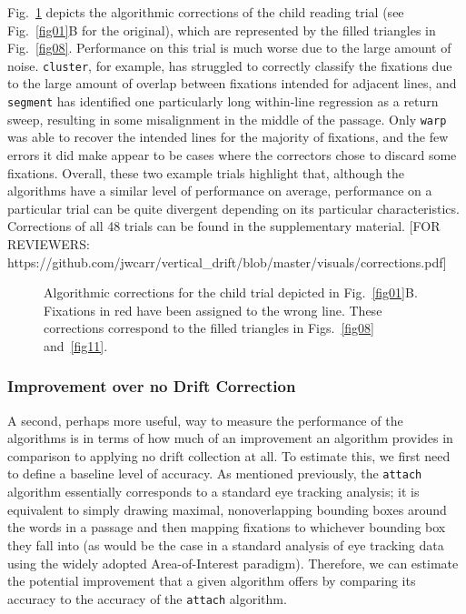 \documentclass[doc,biblatex]{apa7}
\begin{document}
Fig.~\ref{fig10} depicts the algorithmic corrections of the child reading trial (see Fig.~\ref{fig01}B for the original), which are represented by the filled triangles in Fig.~\ref{fig08}. Performance on this trial is much worse due to the large amount of noise. \texttt{cluster}, for example, has struggled to correctly classify the fixations due to the large amount of overlap between fixations intended for adjacent lines, and \texttt{segment} has identified one particularly long within-line regression as a return sweep, resulting in some misalignment in the middle of the passage. Only \texttt{warp} was able to recover the intended lines for the majority of fixations, and the few errors it did make appear to be cases where the correctors chose to discard some fixations. Overall, these two example trials highlight that, although the algorithms have a similar level of performance on average, performance on a particular trial can be quite divergent depending on its particular characteristics. Corrections of all 48 trials can be found in the supplementary material. [FOR REVIEWERS: https://github.com/jwcarr/vertical\_drift/blob/master/visuals/corrections.pdf]

	\begin{figure}
	\vspace*{2pt}
	\caption{Algorithmic corrections for the child trial depicted in Fig.~\ref{fig01}B. Fixations in red have been assigned to the wrong line. These corrections correspond to the filled triangles in Figs.~\ref{fig08} and~\ref{fig11}.}
	\label{fig10}
	\end{figure}

\subsubsection{Improvement over no Drift Correction}

A second, perhaps more useful, way to measure the performance of the algorithms is in terms of how much of an improvement an algorithm provides in comparison to applying no drift collection at all. To estimate this, we first need to define a baseline level of accuracy. As mentioned previously, the \texttt{attach} algorithm essentially corresponds to a standard eye tracking analysis; it is equivalent to simply drawing maximal, nonoverlapping bounding boxes around the words in a passage and then mapping fixations to whichever bounding box they fall into (as would be the case in a standard analysis of eye tracking data using the widely adopted Area-of-Interest paradigm). Therefore, we can estimate the potential improvement that a given algorithm offers by comparing its accuracy to the accuracy of the \texttt{attach} algorithm.
\end{document}
